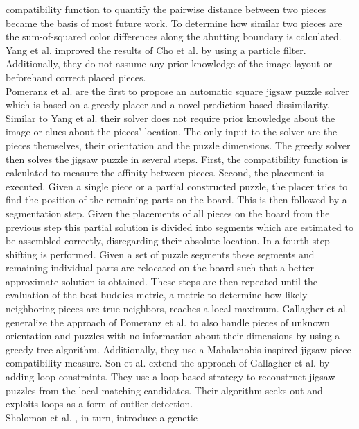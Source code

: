 \documentclass[11pt]{report}
\begin{document}
compatibility function to quantify the pairwise distance between two pieces
became the basis of most future work. To determine how similar two pieces are
the sum-of-squared color differences along the abutting boundary is calculated.
Yang et al. \cite{yang2011particle} improved the results of Cho et al.
\cite{Cho2010} by using a particle filter. Additionally, they do not assume any
prior knowledge of the image layout or beforehand correct placed pieces. \\
Pomeranz et al. \cite{Pomeranz2011} are the first to propose an automatic square
jigsaw puzzle solver which is based on a greedy placer and a novel prediction
based dissimilarity. Similar to Yang et al. \cite{yang2011particle} their solver
does not require prior knowledge about the image or clues about the pieces'
location. The only input to the solver are the pieces themselves, their
orientation and the puzzle dimensions. The greedy solver then solves the jigsaw
puzzle in several steps. First, the compatibility function is calculated to
measure the affinity between pieces. Second, the placement is executed. Given a
single piece or a partial constructed puzzle, the placer tries to find the
position of the remaining parts on the board. This is then followed by a
segmentation step. Given the placements of all pieces on the board from the
previous step this partial solution is divided into segments which are estimated
to be assembled correctly, disregarding their absolute location. In a fourth step
shifting is performed. Given a set of puzzle segments these segments and
remaining individual parts are relocated on the board such that a better
approximate solution is obtained. These steps are then repeated until the
evaluation of the best buddies metric, a metric to determine how likely
neighboring pieces are true neighbors, reaches a local maximum. Gallagher et al.
\cite{gallagher2012jigsaw} generalize the approach of Pomeranz et al.
\cite{Pomeranz2011} to also handle pieces of unknown orientation and puzzles
with no information about their dimensions by using a greedy tree algorithm.
Additionally, they use a Mahalanobis-inspired jigsaw piece compatibility measure.
Son et al. \cite{son2014solving} extend the approach of Gallagher et al.
\cite{gallagher2012jigsaw} by adding loop constraints. They use a loop-based
strategy to reconstruct jigsaw puzzles from the local matching candidates. Their
algorithm seeks out and exploits loops as a form of outlier detection. 
\\
Sholomon et al. \cite{sholomon2013genetic}, in turn, introduce a genetic
\end{document}
